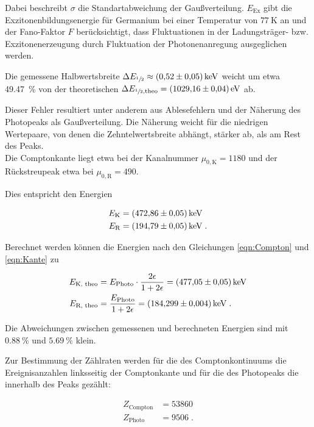 Dabei beschreibt $\sigma$ die Standartabweichung der Gaußverteilung. $E_\text{Ex}$ gibt die
Exzitonenbildungsenergie für Germanium bei einer Temperatur von $\SI{77}{\kelvin}$ an und der Fano-Faktor $F$
berücksichtigt, dass Fluktuationen in der Ladungsträger- bzw. Exzitonenerzeugung
durch Fluktuation der Photonenanregung ausgeglichen werden.

Die gemessene Halbwertsbreite $\Delta E_{\sfrac{1}{2}} \approx \SI{0.52 +- 0.05}{\kilo\eV}$ weicht um etwa
\SI{49.47}{\percent} von der theoretischen $\Delta E_{\sfrac{1}{2}, \text{theo}} = \SI{1029.16 +- 0.04}{\eV}$ ab.

Dieser Fehler resultiert unter anderem aus Ablesefehlern und der Näherung des Photopeaks als Gaußverteilung.
Die Näherung weicht für die niedrigen Wertepaare, von denen die Zehntelwertsbreite abhängt, stärker ab, als am Rest des Peaks. \\

Die Comptonkante liegt etwa bei der Kanalnummer $\mu_{0,\text{K}} = \num{1180}$ und der Rückstreupeak etwa bei
$\mu_{0, \text{R}} = \num{490}$.

Dies entspricht den Energien

\begin{align*}
  E_\text{K} &= \SI{472.86 +- 0.05}{\kilo\eV} \\
  E_\text{R} &= \SI{194.79 +- 0.05}{\kilo\eV} \; .
\end{align*}

Berechnet werden können die Energien nach den Gleichungen \eqref{eqn:Compton} und \eqref{eqn:Kante} zu

\begin{align*}
  E_\text{K, theo} &= E_\text{Photo} \cdot \frac{2 \epsilon}{1 + 2 \epsilon} = \SI{477.05 +- 0.05}{\kilo\eV} \\
  E_\text{R, theo} &= \frac{E_\text{Photo}}{1 + 2 \epsilon} =\SI{184.299 +- 0.004}{\kilo\eV} \; .
\end{align*}

Die Abweichungen zwischen gemessenen und berechneten Energien sind mit $\SI{0.88}{\percent}$ und $\SI{5.69}{\percent}$ klein. 

Zur Bestimmung der Zählraten werden für die des Comptonkontinuums die Ereignisanzahlen linksseitig der Comptonkante
und für die des Photopeaks die innerhalb des Peaks gezählt: 

\begin{align*}
  Z_\text{Compton} &= \num{53860} \\
  Z_\text{Photo} &= \num{9506} \; .
\end{align*}

